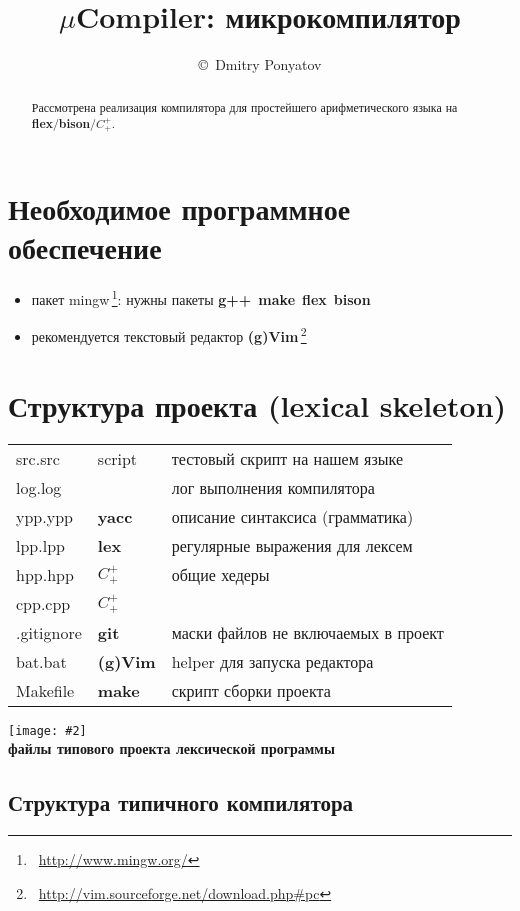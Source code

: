 \documentclass[oneside,10pt]{article}
\title{$\mu$Compiler: микрокомпилятор}
\author{\copyright\ Dmitry Ponyatov \email{dponyatov@gmail.com}}
\newcommand{\fig}[3]{\noindent\texttt{[image: \#2]}\\\textbf{#1}}
\newcommand{\note}[1]{\,\footnote{\ #1}}
\newcommand{\cpp}{$C^+_+$}
\newcommand{\prog}[1]{\textbf{#1}}
\newcommand{\file}[1]{\textit{#1}}
\newcommand{\make}{\prog{make}}
\newcommand{\git}{\prog{git}}
\newcommand{\gvim}{\prog{(g)Vim}}
\newcommand{\flex}{\prog{flex}}
\newcommand{\lex}{\prog{lex}}
\newcommand{\yacc}{\prog{yacc}}
\newcommand{\bison}{\prog{bison}}
\newcommand{\gpp}{\prog{g++}}
\newcommand{\lst}[2]{}
\begin{document}
\maketitle
\begin{abstract}
Рассмотрена реализация компилятора для простейшего арифметического языка на
\flex/\bison/\cpp.
\end{abstract}
\clearpage\tableofcontents\clearpage

\section{Необходимое программное обеспечение}

\begin{itemize}
  \item пакет {mingw}\note{\url{http://www.mingw.org/}}: нужны пакеты
  \gpp\ \make\ \flex\ \bison
  \item рекомендуется текстовый редактор
  \gvim\note{\url{http://vim.sourceforge.net/download.php\#pc}}
\end{itemize}

\section{Структура проекта (lexical skeleton)}

\begin{tabular}{l l l}
src.src & script & тестовый скрипт на нашем языке \\
log.log & & лог выполнения компилятора \\
ypp.ypp & \yacc & описание синтаксиса (грамматика) \\
lpp.lpp & \lex & регулярные выражения для лексем \\
hpp.hpp & \cpp & общие хедеры \\
cpp.cpp & \cpp & \\
.gitignore & \git & маски файлов не включаемых в проект \\
bat.bat & \gvim & helper для запуска редактора \\
Makefile & \make & скрипт сборки проекта \\
\end{tabular}

\lst{\file{core.src}: ядро компилятора}{doc/core.src}

\fig{файлы типового проекта лексической
программы}{files.pdf}{width=\textwidth}

\subsection{Структура типичного компилятора}
\end{document}
